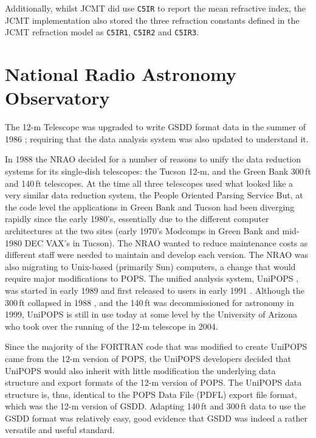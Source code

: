 \documentclass[final,authoryear,5p,times,twocolumn]{elsarticle}
\newcommand{\ascl}[1]{\href{http://www.ascl.net/#1}{ascl:#1}}
\begin{document}
Additionally, whilst JCMT did use \texttt{C5IR} to report the mean
refractive index, the JCMT implementation also stored the three refraction constants
defined in the JCMT refraction model \citep{mtin26} as \texttt{C5IR1}, \texttt{C5IR2}
and \texttt{C5IR3}.

\section{National Radio Astronomy Observatory}


The 12-m Telescope was upgraded to write GSDD format data in the
summer of 1986 \citep{tcus23,1987NRAO30}; requiring that the data
analysis system was also updated to understand it.

In 1988 the NRAO decided for a number of reasons to unify the data
reduction systems for its single-dish telescopes: the Tucson 12-m, and
the Green Bank 300\,ft and 140\,ft telescopes.  At the time all three
telescopes used what looked like a very similar data reduction system,
the People Oriented Parsing Service \citep[POPS;][]{1982POPS}
But, at the code level the applications in Green Bank
and Tucson had been diverging rapidly since the early 1980's,
essentially due to the different computer architectures at the two
sites (early 1970's Modcomps in Green Bank and mid-1980 DEC VAX's in
Tucson).  The NRAO wanted to reduce maintenance costs as different
staff were needed to maintain and develop each version.  The NRAO was
also migrating to Unix-based (primarily Sun) computers, a change that
would require major modifications to POPS. The unified analysis system, UniPOPS
\citep[][\ascl{1503.007}]{UNIPOPS}, was started in early 1989 and first released to users in early
1991 \citep{1991BAAS...23..535V}.  Although the 300\,ft collapsed in
1988 \citep{1990BAAS...22..487V}, and the 140\,ft was
decommissioned for astronomy in 1999, UniPOPS is still in use today at
some level by the University of Arizona who took over the running of
the 12-m telescope in 2004.

Since the majority of the FORTRAN code that was modified to create
UniPOPS came from the 12-m version of POPS, the UniPOPS developers
decided that UniPOPS would also inherit with little modification the
underlying data structure and export formats of the 12-m version of
POPS.  The UniPOPS data structure is, thus, identical to the POPS Data File
(PDFL) export file format, which was the 12-m version of GSDD.  Adapting 140\,ft
and 300\,ft data to use the GSDD format was
relatively easy, good evidence that GSDD was indeed a rather versatile
and useful standard.
\end{document}
